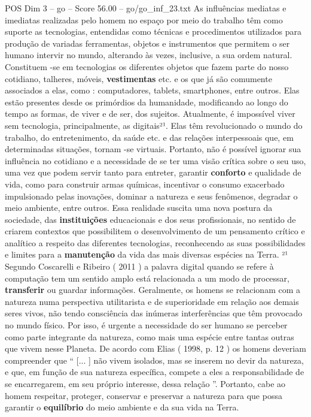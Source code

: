 \begin{textsample}{POS Dim 3 – go – Score 56.00 – go/go\_inf\_23.txt}
As influências mediatas e imediatas realizadas pelo homem no espaço por meio do trabalho têm como suporte as tecnologias, entendidas como técnicas e procedimentos utilizados para produção de variadas ferramentas, objetos e instrumentos que permitem o ser humano intervir no mundo, alterando às vezes, inclusive, a sua ordem natural.
Constituem -se em tecnologias os diferentes objetos que fazem parte do nosso cotidiano, talheres, móveis, \textbf{vestimentas} etc. e os que já são comumente associados a elas, como : computadores, tablets, smartphones, entre outros.
Elas estão presentes desde os primórdios da humanidade, modificando ao longo do tempo as formas, de viver e de ser, dos sujeitos.
Atualmente, é impossível viver sem tecnologia, principalmente, as digitais²¹.
Elas têm revolucionado o mundo do trabalho, do entretenimento, da saúde etc. e das relações interpessoais que, em determinadas situações, tornam -se virtuais.
Portanto, não é possível ignorar sua influência no cotidiano e a necessidade de se ter uma visão crítica sobre o seu uso, uma vez que podem servir tanto para entreter, garantir \textbf{conforto} e qualidade de vida, como para construir armas químicas, incentivar o consumo exacerbado impulsionado pelas inovações, dominar a natureza e seus fenômenos, degradar o meio ambiente, entre outros.
Essa realidade suscita uma nova postura da sociedade, das \textbf{instituições} educacionais e dos seus profissionais, no sentido de criarem contextos que possibilitem o desenvolvimento de um pensamento crítico e analítico a respeito das diferentes tecnologias, reconhecendo as suas possibilidades e limites para a \textbf{manutenção} da vida das mais diversas espécies na Terra. ²¹ Segundo Coscarelli e Ribeiro ( 2011 ) a palavra digital quando se refere à computação tem um sentido amplo está relacionada a um modo de processar, \textbf{transferir} ou guardar informações.
Geralmente, os homens se relacionam com a natureza numa perspectiva utilitarista e de superioridade em relação aos demais seres vivos, não tendo consciência das inúmeras interferências que têm provocado no mundo físico.
Por isso, é urgente a necessidade do ser humano se perceber como parte integrante da natureza, como mais uma espécie entre tantas outras que vivem nesse Planeta.
De acordo com Elias ( 1998, p. 12 ) os homens deveriam compreender que “ [... ] não vivem isolados, mas se inserem no devir da natureza, e que, em função de sua natureza específica, compete a eles a responsabilidade de se encarregarem, em seu próprio interesse, dessa relação ”.
Portanto, cabe ao homem respeitar, proteger, conservar e preservar a natureza para que possa garantir o \textbf{equilíbrio} do meio ambiente e da sua vida na Terra.

\end{textsample}
